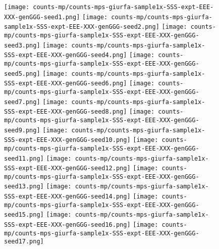 \documentclass[12pt]{article}
\begin{document}
\begin{figure}
%
  \centering
  \texttt{[image: counts-mp/counts-mps-giurfa-sample1x-SSS-expt-EEE-XXX-genGGG-seed1.png]}\hspace{-7mm}
  \texttt{[image: counts-mp/counts-mps-giurfa-sample1x-SSS-expt-EEE-XXX-genGGG-seed2.png]}\hspace{-7mm}
  \texttt{[image: counts-mp/counts-mps-giurfa-sample1x-SSS-expt-EEE-XXX-genGGG-seed3.png]}\hspace{-7mm}
  \texttt{[image: counts-mp/counts-mps-giurfa-sample1x-SSS-expt-EEE-XXX-genGGG-seed4.png]}\hspace{-7mm}
  \texttt{[image: counts-mp/counts-mps-giurfa-sample1x-SSS-expt-EEE-XXX-genGGG-seed5.png]}
%
  \texttt{[image: counts-mp/counts-mps-giurfa-sample1x-SSS-expt-EEE-XXX-genGGG-seed6.png]}\hspace{-7mm}
  \texttt{[image: counts-mp/counts-mps-giurfa-sample1x-SSS-expt-EEE-XXX-genGGG-seed7.png]}\hspace{-7mm}
  \texttt{[image: counts-mp/counts-mps-giurfa-sample1x-SSS-expt-EEE-XXX-genGGG-seed8.png]}\hspace{-7mm}
  \texttt{[image: counts-mp/counts-mps-giurfa-sample1x-SSS-expt-EEE-XXX-genGGG-seed9.png]}\hspace{-7mm}
  \texttt{[image: counts-mp/counts-mps-giurfa-sample1x-SSS-expt-EEE-XXX-genGGG-seed10.png]}
%
  \texttt{[image: counts-mp/counts-mps-giurfa-sample1x-SSS-expt-EEE-XXX-genGGG-seed11.png]}\hspace{-7mm}
  \texttt{[image: counts-mp/counts-mps-giurfa-sample1x-SSS-expt-EEE-XXX-genGGG-seed12.png]}\hspace{-7mm}
  \texttt{[image: counts-mp/counts-mps-giurfa-sample1x-SSS-expt-EEE-XXX-genGGG-seed13.png]}\hspace{-7mm}
  \texttt{[image: counts-mp/counts-mps-giurfa-sample1x-SSS-expt-EEE-XXX-genGGG-seed14.png]}\hspace{-7mm}
  \texttt{[image: counts-mp/counts-mps-giurfa-sample1x-SSS-expt-EEE-XXX-genGGG-seed15.png]}
%
  \texttt{[image: counts-mp/counts-mps-giurfa-sample1x-SSS-expt-EEE-XXX-genGGG-seed16.png]}\hspace{-7mm}
  \texttt{[image: counts-mp/counts-mps-giurfa-sample1x-SSS-expt-EEE-XXX-genGGG-seed17.png]}\hspace{-7mm}

\end{figure}
\end{document}
